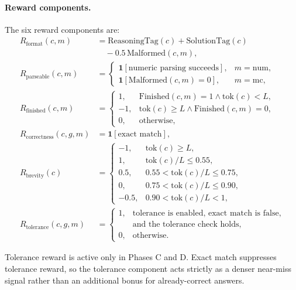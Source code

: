 \documentclass{article} %
\begin{document}
\paragraph{Reward components.}
The six reward components are:
\begin{align}
R_{\mathrm{format}}(c,m) &= \mathrm{ReasoningTag}(c) + \mathrm{SolutionTag}(c) \nonumber\\
&\quad - 0.5\,\mathrm{Malformed}(c,m),\\
R_{\mathrm{parseable}}(c,m) &=
\begin{cases}
\mathbf{1}[\text{numeric parsing succeeds}], & m=\mathrm{num},\\
\mathbf{1}[\mathrm{Malformed}(c,m)=0], & m=\mathrm{mc},
\end{cases}\\
R_{\mathrm{finished}}(c,m) &=
\begin{cases}
1, & \mathrm{Finished}(c,m)=1 \wedge \mathrm{tok}(c)<L,\\
-1, & \mathrm{tok}(c)\ge L \wedge \mathrm{Finished}(c,m)=0,\\
0, & \text{otherwise},
\end{cases}\\
R_{\mathrm{correctness}}(c,g,m) &= \mathbf{1}[\text{exact match}],\\
R_{\mathrm{brevity}}(c) &=
\begin{cases}
-1, & \mathrm{tok}(c)\ge L,\\
1, & \mathrm{tok}(c)/L \le 0.55,\\
0.5, & 0.55 < \mathrm{tok}(c)/L \le 0.75,\\
0, & 0.75 < \mathrm{tok}(c)/L \le 0.90,\\
-0.5, & 0.90 < \mathrm{tok}(c)/L < 1,
\end{cases}\\
R_{\mathrm{tolerance}}(c,g,m) &=
\begin{cases}
1, & \text{tolerance is enabled, exact match is false,}\\
   & \text{and the tolerance check holds},\\
0, & \text{otherwise}.
\end{cases}
\end{align}

Tolerance reward is active only in Phases C and D. Exact match suppresses tolerance reward, so the tolerance component acts strictly as a denser near-miss signal rather than an additional bonus for already-correct answers.
\end{document}
